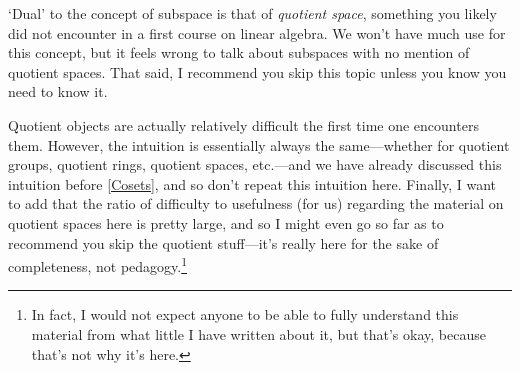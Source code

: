 `Dual' to the concept of subspace is that of \emph{quotient space}, something you likely did not encounter in a first course on linear algebra.  We won't have much use for this concept, but it feels wrong to talk about subspaces with no mention of quotient spaces.  That said, I recommend you skip this topic unless you know you need to know it.

Quotient objects are actually relatively difficult the first time one encounters them.  However, the intuition is essentially always the same---whether for quotient groups, quotient rings, quotient spaces, etc.---and we have already discussed this intuition before \cref{Cosets}, and so don't repeat this intuition here.  Finally, I want to add that the ratio of difficulty to usefulness (for us) regarding the material on quotient spaces here is pretty large, and so I might even go so far as to recommend you skip the quotient stuff---it's really here for the sake of completeness, not pedagogy.\footnote{In fact, I would not expect anyone to be able to fully understand this material from what little I have written about it, but that's okay, because that's not why it's here.}
